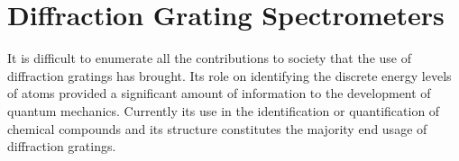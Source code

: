 \documentclass[12pt,twoside,english]{book}
\renewcommand{\~}{\perispomeni}%
\numberwithin{equation}{section}
\numberwithin{figure}{section}
\newcommand\fnurl[2]{%
 \href{#2}{#1}\footnote{\url{#2}}%
}
\begin{document}
%
%
%
%
%
%
%
\chapter{Diffraction Grating Spectrometers}
It is difficult to enumerate all the contributions to society that the use of diffraction gratings has brought. Its role on identifying the discrete energy levels of atoms provided a significant amount of information to the development of quantum mechanics. Currently its use in the identification or quantification of chemical compounds and its structure constitutes the majority end usage of diffraction gratings.




%
%
\end{document}
